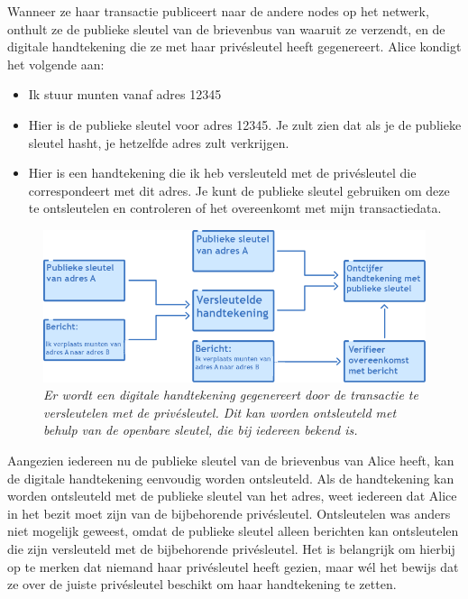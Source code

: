 Wanneer ze haar transactie publiceert naar de andere nodes op het netwerk, onthult ze de publieke sleutel van de brievenbus van waaruit ze verzendt, en de digitale handtekening die ze met haar privésleutel heeft gegenereert. Alice kondigt het volgende aan:

\begin{itemize}
    \item Ik stuur munten vanaf adres 12345
    \item Hier is de publieke sleutel voor adres 12345. Je zult zien dat als je de publieke sleutel hasht, je hetzelfde adres zult verkrijgen.
    \item Hier is een handtekening die ik heb versleuteld met de privésleutel die correspondeert met dit adres. Je kunt de publieke sleutel gebruiken om deze te ontsleutelen en controleren of het overeenkomt met mijn transactiedata.
\end{itemize}

\begin{figure}
    \centering
    \includegraphics[width=\textwidth]{images/fig13.png}
    \caption{\footnotesize{\textit{Er wordt een digitale handtekening gegenereert door de transactie te versleutelen met de privésleutel. Dit kan worden ontsleuteld met behulp van de openbare sleutel, die bij iedereen bekend is.}}}
    \label{fig13}
\end{figure}

Aangezien iedereen nu de publieke sleutel van de brievenbus van Alice heeft, kan de digitale handtekening eenvoudig worden ontsleuteld. Als de handtekening kan worden ontsleuteld met de publieke sleutel van het adres, weet iedereen dat Alice in het bezit moet zijn van de bijbehorende privésleutel. Ontsleutelen was anders niet mogelijk geweest, omdat de publieke sleutel alleen berichten kan ontsleutelen die zijn versleuteld met de bijbehorende privésleutel. Het is belangrijk om hierbij op te merken dat niemand haar privésleutel heeft gezien, maar wél het bewijs dat ze over de juiste privésleutel beschikt om haar handtekening te zetten.

